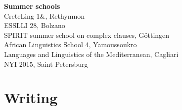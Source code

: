 \documentclass[11pt, a4paper]{article} %
\newcommand{\years}[1]{\marginnote{\scriptsize #1}} %
\begin{document}
\textbf{Summer schools} \\
\years{\hfill ---} CreteLing 1\thinspace\&, Rethymnon \\
\years{\hfill ---}ESSLLI 28, Bolzano \\ %
\years{\hfill ---}SPIRIT summer school on complex clauses, G\"ottingen \\
\years{\hfill ---}African Linguistics School 4, Yamoussoukro \\
\years{\hfill ---}Languages and Linguistics of the Mediterranean, Cagliari \\
\years{\hfill ---}NYI 2015, Saint Petersburg


\section*{Writing}
\end{document}

